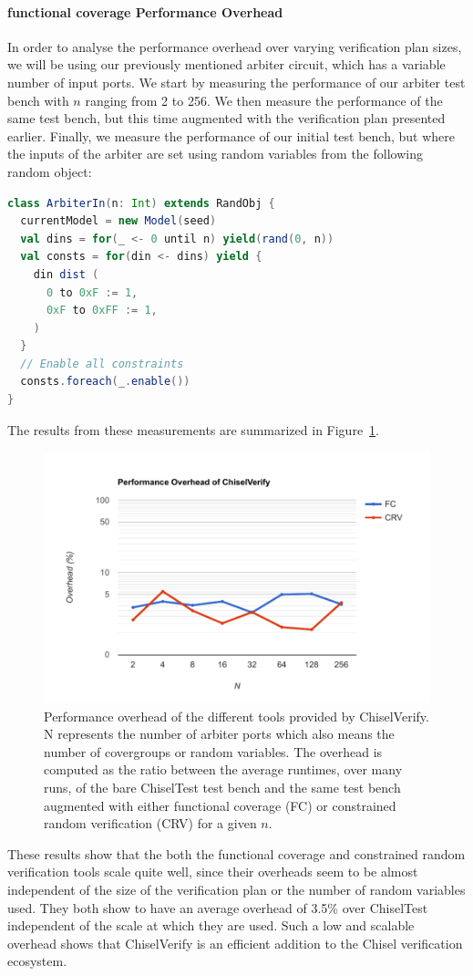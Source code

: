 \documentclass[conference]{IEEEtran}
\begin{document}
\paragraph{functional coverage Performance Overhead} In order to analyse the performance overhead over varying verification plan sizes, we will be using our previously mentioned arbiter circuit, which has a variable number of input ports.
We start by measuring the performance of our arbiter test bench with $n$ ranging from 2 to 256.
We then measure the performance of the same test bench, but this time augmented with the verification plan presented earlier.
Finally, we measure the performance of our initial test bench, but where the inputs of the arbiter are set using random variables from the following random object:
\begin{lstlisting}[language=scala]
class ArbiterIn(n: Int) extends RandObj {
  currentModel = new Model(seed)
  val dins = for(_ <- 0 until n) yield(rand(0, n))
  val consts = for(din <- dins) yield {
    din dist (
      0 to 0xF := 1,
      0xF to 0xFF := 1,
    )
  }
  // Enable all constraints
  consts.foreach(_.enable())
}
\end{lstlisting}
The results from these measurements are summarized in Figure~\ref{fig:cvoverhead}.
\begin{figure}[h]
  \centering
  \includegraphics[trim=0.7cm 0.5cm 1cm 1cm, clip, width=.9\linewidth]{cvoverhead.pdf}
  \caption{Performance overhead of the different tools provided by ChiselVerify. N represents the number of arbiter ports which also means the number of covergroups or random variables. The overhead is computed as the ratio between the average runtimes, over many runs, of the bare ChiselTest test bench and the same test bench augmented with either functional coverage (FC) or constrained random verification (CRV) for a given $n$.}
  \label{fig:cvoverhead}
\end{figure}
These results show that the both the functional coverage and constrained random verification tools scale quite well, since their overheads seem to be almost independent of the size of the verification plan or the number of random variables used.
They both show to have an average overhead of 3.5\% over ChiselTest independent of the scale at which they are used.
Such a low and scalable overhead shows that ChiselVerify is an efficient addition to the Chisel verification ecosystem.
\end{document}

